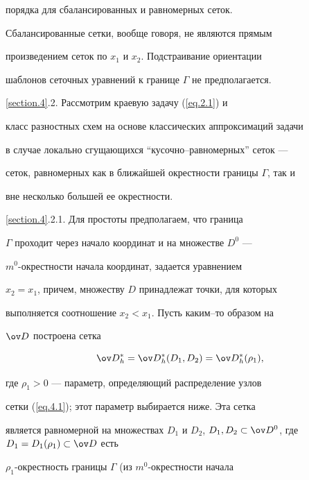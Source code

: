 порядка для сбалансированных и равномерных сеток.


Сбалансированные сетки, вообще говоря, не являются прямым


произведением сеток по $x_1$ и $x_2$. Подстраивание ориентации


шаблонов сеточных уравнений к границе $\varGamma$ не предполагается.


\medskip





{\ref{section.4}.2.} Рассмотрим краевую задачу (\ref{eq.2.1}) и


класс разностных схем на основе классических аппроксимаций задачи


в случае локально сгущающихся ``кусочно--равномерных'' сеток ---


сеток, равномерных как в ближайшей окрестности границы $\varGamma$, так и


вне несколько большей ее окрестности.


\medskip





{\ref{section.4}.2.1.} Для простоты предполагаем, что граница


$\varGamma$ проходит через начало координат и на множестве $D^0$ ---


$m^0$-окрестности начала координат, задается уравнением


$x_2=x_1$, причем, множеству $D$ принадлежат точки, для которых


выполняется соотношение $x_2<x_1$. Пусть каким--то образом на


$\od$ построена сетка


\begin{equation}


\label{eq.4.1}


\od{}_h^*=\od{}_h^*(D_1,D_2)=\od{}_h^*(\rho_1),


\end{equation}


где $\rho_1>0$ --- параметр, определяющий распределение узлов


сетки (\ref{eq.4.1}); этот параметр выбирается ниже. Эта сетка


является равномерной на множествах $D_1$ и $D_2$, $D_1,D_2\subset


\od{}^0$, где $D_1=D_1(\rho_1)\subset \od$ есть


$\rho_1$-окрестность границы $\varGamma$ (из $m^0$-окрестности начала



